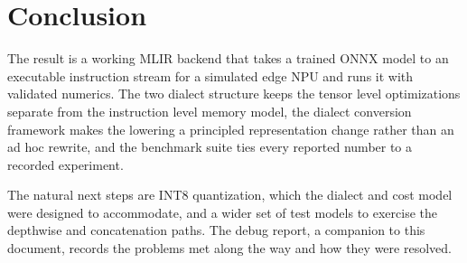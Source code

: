 \section{Conclusion}

The result is a working MLIR backend that takes a trained ONNX model to an
executable instruction stream for a simulated edge NPU and runs it with validated
numerics. The two dialect structure keeps the tensor level optimizations separate
from the instruction level memory model, the dialect conversion framework makes
the lowering a principled representation change rather than an ad hoc rewrite, and
the benchmark suite ties every reported number to a recorded experiment.

The natural next steps are INT8 quantization, which the dialect and cost model were
designed to accommodate, and a wider set of test models to exercise the depthwise
and concatenation paths. The debug report, a companion to this document, records
the problems met along the way and how they were resolved.
